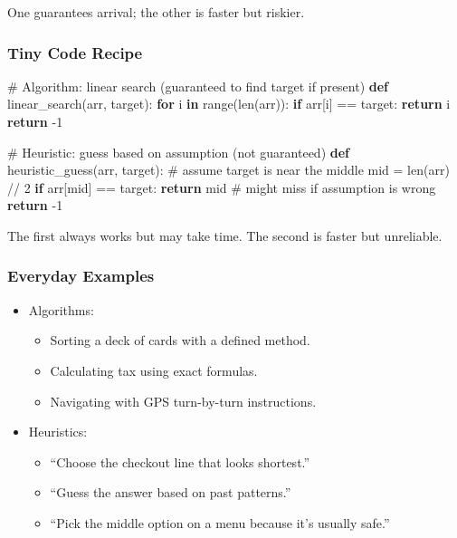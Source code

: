 \documentclass[
  letterpaper,
  DIV=11,
  numbers=noendperiod]{scrreprt}
\newenvironment{Shaded}{\begin{snugshade}}{\end{snugshade}}
\newcommand{\BuiltInTok}[1]{\textcolor[rgb]{0.00,0.23,0.31}{#1}}
\newcommand{\CommentTok}[1]{\textcolor[rgb]{0.37,0.37,0.37}{#1}}
\newcommand{\ControlFlowTok}[1]{\textcolor[rgb]{0.00,0.23,0.31}{\textbf{#1}}}
\newcommand{\DecValTok}[1]{\textcolor[rgb]{0.68,0.00,0.00}{#1}}
\newcommand{\KeywordTok}[1]{\textcolor[rgb]{0.00,0.23,0.31}{\textbf{#1}}}
\newcommand{\NormalTok}[1]{\textcolor[rgb]{0.00,0.23,0.31}{#1}}
\newcommand{\OperatorTok}[1]{\textcolor[rgb]{0.37,0.37,0.37}{#1}}
\providecommand{\tightlist}{%
  \setlength{\itemsep}{0pt}\setlength{\parskip}{0pt}}
\begin{document}
One guarantees arrival; the other is faster but riskier.

\subsubsection{Tiny Code Recipe}\label{tiny-code-recipe-8}

\begin{Shaded}
\begin{Highlighting}[]
\CommentTok{\# Algorithm: linear search (guaranteed to find target if present)}
\KeywordTok{def}\NormalTok{ linear\_search(arr, target):}
    \ControlFlowTok{for}\NormalTok{ i }\KeywordTok{in} \BuiltInTok{range}\NormalTok{(}\BuiltInTok{len}\NormalTok{(arr)):}
        \ControlFlowTok{if}\NormalTok{ arr[i] }\OperatorTok{==}\NormalTok{ target:}
            \ControlFlowTok{return}\NormalTok{ i}
    \ControlFlowTok{return} \OperatorTok{{-}}\DecValTok{1}

\CommentTok{\# Heuristic: guess based on assumption (not guaranteed)}
\KeywordTok{def}\NormalTok{ heuristic\_guess(arr, target):}
    \CommentTok{\# assume target is near the middle}
\NormalTok{    mid }\OperatorTok{=} \BuiltInTok{len}\NormalTok{(arr) }\OperatorTok{//} \DecValTok{2}
    \ControlFlowTok{if}\NormalTok{ arr[mid] }\OperatorTok{==}\NormalTok{ target:}
        \ControlFlowTok{return}\NormalTok{ mid}
    \CommentTok{\# might miss if assumption is wrong}
    \ControlFlowTok{return} \OperatorTok{{-}}\DecValTok{1}
\end{Highlighting}
\end{Shaded}

The first always works but may take time. The second is faster but
unreliable.

\subsubsection{Everyday Examples}\label{everyday-examples-7}

\begin{itemize}
\item
  Algorithms:

  \begin{itemize}
  \tightlist
  \item
    Sorting a deck of cards with a defined method.
  \item
    Calculating tax using exact formulas.
  \item
    Navigating with GPS turn-by-turn instructions.
  \end{itemize}
\item
  Heuristics:

  \begin{itemize}
  \tightlist
  \item
    ``Choose the checkout line that looks shortest.''
  \item
    ``Guess the answer based on past patterns.''
  \item
    ``Pick the middle option on a menu because it's usually safe.''
  \end{itemize}
\end{itemize}
\end{document}
